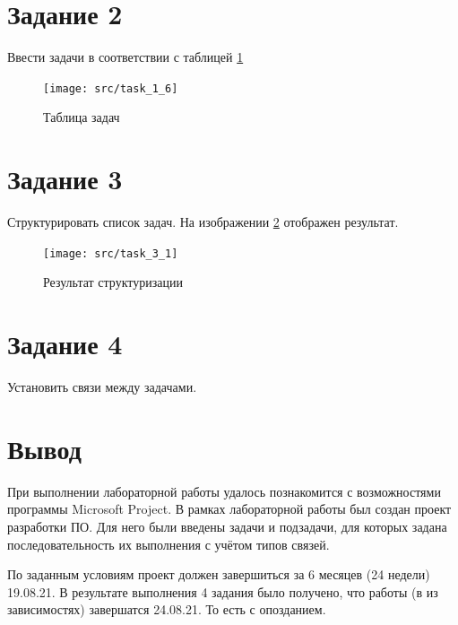 \section{Задание 2}

Ввести задачи в соответствии с таблицей \ref{fig:task16}
\begin{figure}[H]
	\centering
	\texttt{[image: src/task\_1\_6]}
	\caption{Таблица задач}
	\label{fig:task16}
\end{figure}

\section{Задание 3}

Структурировать список задач. На изображении \ref{fig:task31} отображен результат.

\begin{figure}[H]
	\centering
	\texttt{[image: src/task\_3\_1]}
	\caption{Результат структуризации}
	\label{fig:task31}
\end{figure}

\section{Задание 4}

Установить связи между задачами.

\section{Вывод}
При выполнении лабораторной работы удалось познакомится с возможностями программы Microsoft Project. В рамках лабораторной работы был создан проект разработки ПО. Для него были введены задачи и подзадачи, для которых задана последовательность их выполнения с учётом типов связей.

По заданным условиям проект должен завершиться за 6 месяцев (24 недели) 19.08.21. В результате выполнения 4 задания было получено, что работы (в из зависимостях) завершатся 24.08.21. То есть с опозданием.






